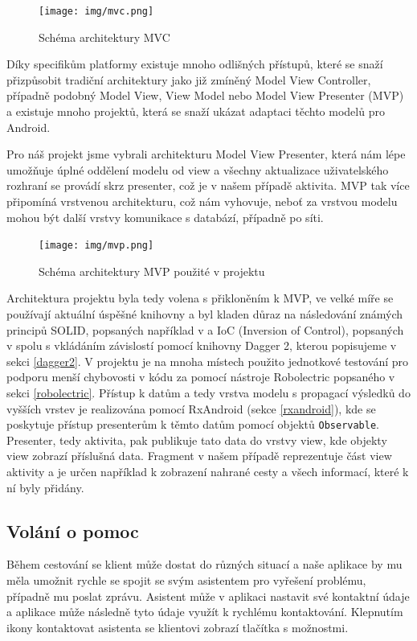 \documentclass[czech,master,public,dept460,male,java,cpdeclaration]{diploma}
\begin{document}
\begin{figure}[H]
        \centering
                \texttt{[image: img/mvc.png]}
        \caption{Schéma architektury MVC}
        \label{fig:mvc}
\end{figure}

Díky specifikům platformy existuje mnoho odlišných přístupů, které se snaží přizpůsobit
tradiční architektury jako již zmíněný Model View Controller, případně podobný Model View, View Model
nebo Model View Presenter (MVP) a existuje mnoho projektů, která se snaží ukázat adaptaci těchto modelů
pro Android.

Pro náš projekt jsme vybrali architekturu Model View Presenter, která nám lépe umožňuje
úplné oddělení modelu od view a všechny aktualizace uživatelského rozhraní se provádí skrz presenter,
 což je v našem případě aktivita. MVP tak více připomíná vrstvenou architekturu, což nám vyhovuje, neboť
za vrstvou modelu mohou být další vrstvy komunikace s databází, případně po síti.

\begin{figure}[H]
        \centering
                \texttt{[image: img/mvp.png]}
        \caption{Schéma architektury MVP použité v projektu}
        \label{fig:mvp}
\end{figure}

Architektura projektu byla tedy volena s přikloněním k MVP, ve velké míře se používají
aktuální úspěšné knihovny a byl kladen důraz na následování známých principů SOLID, popsaných
například v \cite{solid} a IoC (Inversion of Control), popsaných v \cite{ioc} spolu s vkládáním
závislostí pomocí knihovny Dagger 2, kterou popisujeme v sekci \ref{dagger2}.
V projektu je na mnoha místech použito jednotkové testování pro podporu menší chybovosti v kódu
za pomocí nástroje Robolectric popsaného v sekci \ref{robolectric}. Přístup k datům a tedy
vrstva modelu s propagací výsledků do vyšších vrstev je realizována
 pomocí RxAndroid (sekce \ref{rxandroid}), kde se poskytuje přístup
presenterům k těmto datům pomocí objektů \texttt{Observable}. Presenter, tedy aktivita,
pak publikuje tato data do vrstvy view, kde objekty view zobrazí příslušná data. Fragment v našem
případě reprezentuje část view aktivity a je určen například k zobrazení nahrané cesty a všech informací,
které k ní byly přidány.


\subsection{Volání o pomoc}
Během cestování se klient může dostat do různých situací a naše aplikace by mu měla umožnit rychle se
spojit se svým asistentem pro vyřešení problému, případně mu poslat zprávu. Asistent může v aplikaci nastavit své kontaktní
údaje a aplikace může následně tyto údaje využít k rychlému kontaktování. Klepnutím ikony kontaktovat
asistenta se klientovi zobrazí tlačítka s možnostmi.
\end{document}
